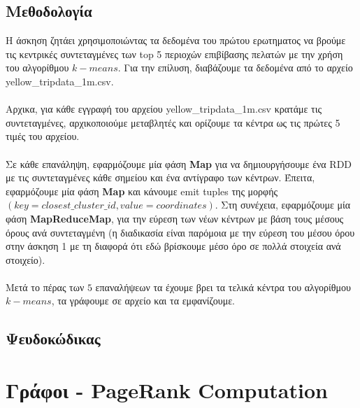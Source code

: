 \documentclass{ntua}
\begin{document}
\subsection{Μεθοδολογία}
H άσκηση ζητάει χρησιμοποιώντας τα δεδομένα του πρώτου ερωτηματος να βρούμε τις κεντρικές συντεταγμένες των top 5 περιοχών επιβίβασης πελατών με την χρήση του αλγορίθμου $k-means$. Για την επίλυση, διαβάζουμε τα δεδομένα από το αρχείο yellow\_tripdata\_1m.csv. \\ \\
Αρχικα, για κάθε εγγραφή του αρχείου yellow\_tripdata\_1m.csv κρατάμε τις συντεταγμένες, αρχικοποιούμε μεταβλητές και ορίζουμε τα κέντρα ως τις πρώτες 5 τιμές του αρχείου.\\ \\ 
Σε κάθε επανάληψη, εφαρμόζουμε μία φάση \textbf{Map} για να δημιουργήσουμε ένα RDD με τις συντεταγμένες κάθε σημείου και ένα αντίγραφο των κέντρων. Έπειτα, εφαρμόζουμε μία φάση \textbf{Map} και κάνουμε emit tuples της μορφής $( key = closest\_cluster\_id, value = coordinates)$. Στη συνέχεια, εφαρμόζουμε μία φάση \textbf{MapReduceMap}, για την εύρεση των νέων κέντρων με βάση τους μέσους όρους ανά συντεταγμένη (η διαδικασία είναι παρόμοια με την εύρεση του μέσου όρου στην άσκηση 1 με τη διαφορά ότι εδώ βρίσκουμε μέσο όρο σε πολλά στοιχεία ανά στοιχείο). \\ \\ 
Μετά το πέρας των $5$ επαναλήψεων τα έχουμε βρει τα τελικά κέντρα του αλγορίθμου $k-means$, τα γράφουμε σε αρχείο και τα εμφανίζουμε.  
\subsection{Ψευδοκώδικας}

\newpage

\section{Γράφοι - PageRank Computation}
\end{document}
